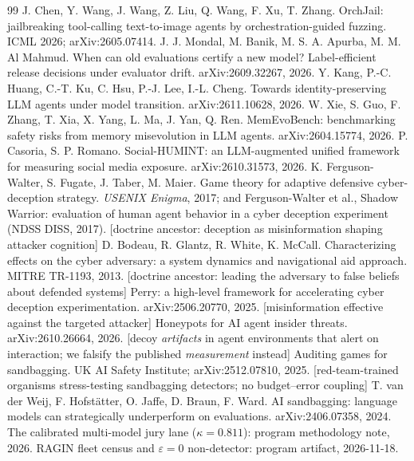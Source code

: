 \documentclass[10pt,twocolumn]{article}
\begin{document}
\begin{thebibliography}{99}
 J. Chen, Y. Wang, J. Wang, Z. Liu, Q. Wang, F. Xu, T. Zhang. OrchJail: jailbreaking tool-calling text-to-image agents by orchestration-guided fuzzing. ICML 2026; arXiv:2605.07414.
 J. J. Mondal, M. Banik, M. S. A. Apurba, M. M. Al Mahmud. When can old evaluations certify a new model? Label-efficient release decisions under evaluator drift. arXiv:2609.32267, 2026.
 Y. Kang, P.-C. Huang, C.-T. Ku, C. Hsu, P.-J. Lee, I.-L. Cheng. Towards identity-preserving LLM agents under model transition. arXiv:2611.10628, 2026.
 W. Xie, S. Guo, F. Zhang, T. Xia, X. Yang, L. Ma, J. Yan, Q. Ren. MemEvoBench: benchmarking safety risks from memory misevolution in LLM agents. arXiv:2604.15774, 2026.
 P. Casoria, S. P. Romano. Social-HUMINT: an LLM-augmented unified framework for measuring social media exposure. arXiv:2610.31573, 2026.
 K. Ferguson-Walter, S. Fugate, J. Taber, M. Maier. Game theory for adaptive defensive cyber-deception strategy. \emph{USENIX Enigma}, 2017; and Ferguson-Walter et al., Shadow Warrior: evaluation of human agent behavior in a cyber deception experiment (NDSS DISS, 2017). [doctrine ancestor: deception as misinformation shaping attacker cognition]
 D. Bodeau, R. Glantz, R. White, K. McCall. Characterizing effects on the cyber adversary: a system dynamics and navigational aid approach. MITRE TR-1193, 2013. [doctrine ancestor: leading the adversary to false beliefs about defended systems]
 Perry: a high-level framework for accelerating cyber deception experimentation. arXiv:2506.20770, 2025. [misinformation effective against the targeted attacker]
 Honeypots for AI agent insider threats. arXiv:2610.26664, 2026. [decoy \emph{artifacts} in agent environments that alert on interaction; we falsify the published \emph{measurement} instead]
 Auditing games for sandbagging. UK AI Safety Institute; arXiv:2512.07810, 2025. [red-team-trained organisms stress-testing sandbagging detectors; no budget--error coupling]
 T. van der Weij, F. Hofst\"atter, O. Jaffe, D. Braun, F. Ward. AI sandbagging: language models can strategically underperform on evaluations. arXiv:2406.07358, 2024.
 The calibrated multi-model jury lane ($\kappa=0.811$): program methodology note, 2026.
 RAGIN fleet census and $\varepsilon=0$ non-detector: program artifact, 2026-11-18.
\end{thebibliography}
\end{document}
